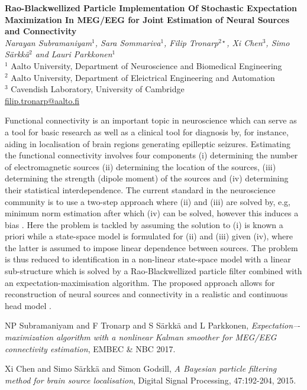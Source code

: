 \documentclass[12pt]{article}
\newcommand{\postertitle}[1]{{\Large\bf #1}\\[12pt]}
\newcommand{\authors}[1]{\emph{#1}\\}
\newcommand{\affiliations}[1]{{#1}\\}
\newcommand{\contacts}[1]{{#1}}
\begin{document}
\begin{center}
\vspace*{0.5cm}
%
\postertitle{Rao-Blackwellized Particle Implementation Of Stochastic Expectation Maximization In MEG/EEG for Joint Estimation of Neural Sources and Connectivity}
%
% 
\authors{Narayan Subramaniyam$^1$, Sara Sommariva$^1$, Filip Tronarp$^{2\star}$, Xi Chen$^3$, Simo S\"arkk\"a$^2$ and Lauri Parkkonen$^1$}
%
\affiliations{$^1$ Aalto University, Department of Neuroscience and Biomedical Engineering}
\affiliations{$^2$ Aalto University, Department of Eleictrical Engineering and Automation}
\affiliations{$^3$ Cavendish Laboratory, University of Cambridge}
%
\contacts{\url{filip.tronarp@aalto.fi}} %
%
\vspace*{0.3cm}
\end{center}

Functional connectivity is an important topic in neuroscience which can serve as a tool for basic research as well as a clinical tool for diagnosis by, for instance, aiding in localisation of brain regions generating epilleptic seizures. Estimating the functional connectivity involves four components (i) determining the number of electromagnetic sources (ii) determining the location of the sources, (iii) determining the strength (dipole moment) of the sources and (iv) determining their statistical interdependence. The current standard in the neuroscience community is to use a two-step approach where (ii) and (iii) are solved by, e.g, minimum norm estimation after which (iv) can be solved, however this induces a bias \cite{EMBEC17}. Here the problem is tackled by assuming the solution to (i) is known a priori while a state-space model is formulated for (ii) and (iii) given (iv), where the latter is assumed to impose linear dependence between sources. The problem is thus reduced to identification in a non-linear state-space model with a linear sub-structure which is solved by a Rao-Blackwellized particle filter combined with an expectation-maximisation algorithm. The proposed approach allows for reconstruction of neural sources and connectivity in a realistic and continuous head model \cite{XiChen}.  


\begin{thebibliography}{1}	
NP Subramaniyam and F Tronarp and S S\"arkk\"a and L Parkkonen,
\textit{Expectation–-maximization algorithm with a nonlinear Kalman smoother for MEG/EEG connectivity estimation},
EMBEC \& NBC 2017. 

Xi Chen and Simo S\"arkk\"a and Simon Godsill, 
\textit{A Bayesian particle filtering method for brain source localisation},
Digital Signal Processing, 47:192-204, 2015. 

\end{thebibliography}
\end{document}
